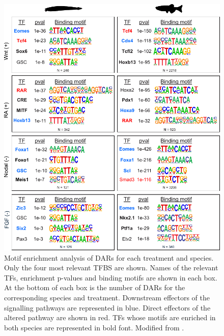 \begin{figure}[hp]
\centering
\includegraphics[width=1\textwidth]{Figures/ATAC_motif_pathways}
\caption[Motif enrichment of DARs]{ Motif enrichment analysis of DARs for each treatment and species. Only the four most relevant TFBS are shown. Names of the relevant TFs, enrichment p-values and binding motifs  are shown in each box. At the bottom of each box is the number of DARs for the corresponding species and treatment. Downstream effectors of the signalling pathways are represented in blue. Direct effectors of the altered pathway are shown in red. TFs whose motifs are enriched in both species are represented in bold font. Modified from \parencite{gil-galvez_gain_2022}.
}
\label{fig:ATAC_motifs_pathways}
\end{figure} 

